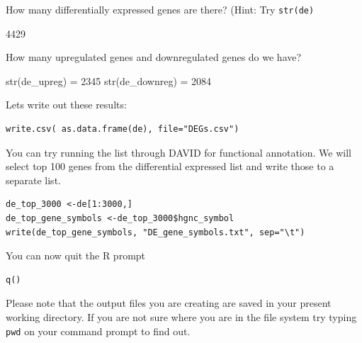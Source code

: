 \begin{questions}
How many differentially expressed genes are there? (Hint: Try \texttt{str(de)}
\begin{answer}
4429
\end{answer}

How many upregulated genes and downregulated genes do we have?
\begin{answer}
str(de\_upreg) = 2345
str(de\_downreg) = 2084
\end{answer}

\end{questions}

\begin{steps}
Lets write out these results:
\begin{lstlisting}
write.csv( as.data.frame(de), file="DEGs.csv")
\end{lstlisting}
You can try running the list through DAVID for functional annotation.
We will select top 100 genes from the differential expressed list and write those to a separate list.

\begin{lstlisting}
de_top_3000 <-de[1:3000,]
de_top_gene_symbols <-de_top_3000$hgnc_symbol
write(de_top_gene_symbols, "DE_gene_symbols.txt", sep="\t")
\end{lstlisting}

You can now quit the R prompt
\begin{lstlisting}
q()
\end{lstlisting}
\end{steps}

\begin{note}
Please note that the output files you are creating are saved in your present working directory. If you are not sure where you are in the file system try typing \texttt{pwd} on your command prompt to find out.
\end{note}
\newpage


